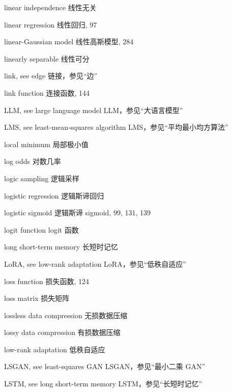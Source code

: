 linear independence 线性无关\par
linear regression 线性回归, 97\par
linear-Gaussian model 线性高斯模型, 284\par
linearly separable 线性可分\par
link, see edge 链接，参见“边”\par
link function 连接函数, 144\par
LLM, see large language model LLM，参见“大语言模型”\par
LMS, see least-mean-squares algorithm LMS，参见“平均最小均方算法”\par
local minimum 局部极小值\par
log odds 对数几率\par
logic sampling 逻辑采样\par
logistic regression 逻辑斯谛回归\par
logistic sigmoid 逻辑斯谛 sigmoid, 99, 131, 139\par
logit function logit 函数\par
long short-term memory 长短时记忆\par
LoRA, see low-rank adaptation LoRA，参见“低秩自适应”\par
loss function 损失函数, 124\par
loss matrix 损失矩阵\par
lossless data compression 无损数据压缩\par
lossy data compression 有损数据压缩\par
low-rank adaptation 低秩自适应\par
LSGAN, see least-squares GAN LSGAN，参见“最小二乘 GAN”\par
LSTM, see long short-term memory LSTM，参见“长短时记忆”\par
